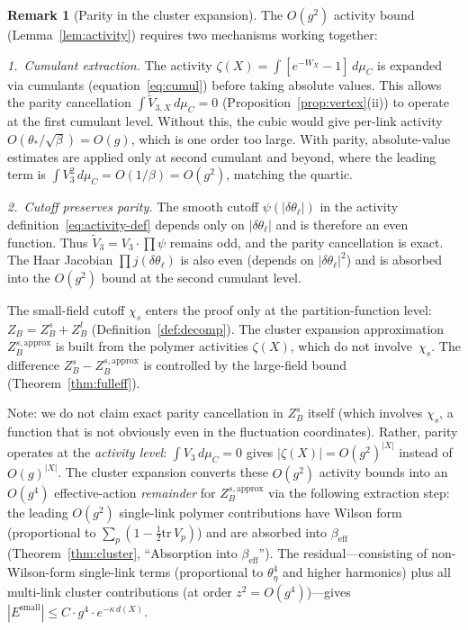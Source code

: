 \documentclass[11pt]{article}
\theoremstyle{definition}
\newtheorem{remark}[theorem]{Remark}
\newcommand{\tr}{\mathrm{tr}}
\begin{document}
\begin{remark}[Parity in the cluster expansion]%
\label{rem:parity-cluster}
The $O(g^2)$ activity bound (Lemma~\ref{lem:activity}) requires
two mechanisms working together:

\emph{1.~Cumulant extraction.}
The activity $\zeta(X)=\int[e^{-W_X}-1]\,d\mu_C$ is expanded
via cumulants (equation~\eqref{eq:cumul}) before taking
absolute values.  This allows the parity cancellation
$\int\widetilde{V}_{3,X}\,d\mu_C=0$
(Proposition~\ref{prop:vertex}(ii)) to operate at the first
cumulant level.  Without this, the cubic would give per-link
activity $O(\theta_*/\sqrt{\beta})=O(g)$, which is one order
too large.  With parity, absolute-value estimates are applied only
at second cumulant and beyond, where the leading term is
$\int V_3^2\,d\mu_C=O(1/\beta)=O(g^2)$, matching the quartic.

\emph{2.~Cutoff preserves parity.}
The smooth cutoff $\psi(|\delta\theta_\ell|)$ in the activity
definition~\eqref{eq:activity-def} depends only on
$|\delta\theta_\ell|$ and is therefore an even function.  Thus
$\widetilde{V}_3=V_3\cdot\prod\psi$ remains odd, and the parity
cancellation is exact.  The Haar Jacobian
$\prod j(\delta\theta_\ell)$ is also even (depends on
$|\delta\theta_\ell|^2$) and is absorbed into the $O(g^2)$ bound
at the second cumulant level.

The small-field cutoff $\chi_s$ enters the proof only at the
partition-function level: $Z_B=Z_B^s+Z_B^l$
(Definition~\ref{def:decomp}).  The cluster expansion approximation
$Z_B^{s,\mathrm{approx}}$ is built from the polymer activities
$\zeta(X)$, which do not involve~$\chi_s$.  The difference
$Z_B^s-Z_B^{s,\mathrm{approx}}$ is controlled by the large-field
bound (Theorem~\ref{thm:fulleff}).

Note: we do not claim exact parity cancellation in
$Z_B^s$ itself (which involves $\chi_s$, a function that is
not obviously even in the fluctuation coordinates).  Rather,
parity operates at the \emph{activity level}: $\int V_3\,d\mu_C=0$
gives $|\zeta(X)|=O(g^2)^{|X|}$ instead of $O(g)^{|X|}$.
The cluster expansion converts these $O(g^2)$ activity bounds into
an $O(g^4)$ effective-action \emph{remainder} for
$Z_B^{s,\mathrm{approx}}$ via the following extraction step:
the leading $O(g^2)$ single-link polymer contributions have
Wilson form (proportional to $\sum_p(1-\frac{1}{2}\tr\,V_p)$) and
are absorbed into $\beta_{\mathrm{eff}}$
(Theorem~\ref{thm:cluster}, ``Absorption into $\beta_{\mathrm{eff}}$'').
The residual---consisting of non-Wilson-form single-link terms
(proportional to $\theta_\eta^4$ and higher harmonics) plus all
multi-link cluster contributions (at order $z^2=O(g^4)$)---gives
$|E^{\mathrm{small}}|\le C\cdot g^4\cdot e^{-\kappa\,d(X)}$.


\end{remark}
\end{document}
